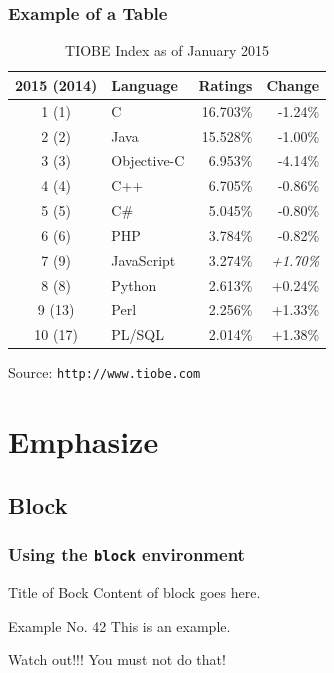 \documentclass[english,hangout]{FrankfurtUAS}
\begin{document}
\begin{frame}
 \frametitle{Example of a Table}
\begin{table}[ht]
 \begin{tabular}{clrr} \toprule
 2015 (2014)	& 	Language 	& Ratings 	& Change \\
 \midrule
1	(1)		& C		& 16.703\%	& -1.24\% \\
2	   (2)		& Java	& 15.528\%	& -1.00\% \\
3	   (3)		& Objective-C	& 6.953\%	& -4.14\% \\
4	   (4)		& C++	& 6.705\%	& -0.86\% \\
5	   (5)		& C\#		& 5.045\%	& -0.80\% \\
6	   (6)		& PHP	& 3.784\%	& -0.82\% \\
7	   (9)		& JavaScript	& 3.274\%	& \emph{+1.70\%} \\
8	   (8)		& Python	& 2.613\%	& +0.24\% \\
9	 (13)		& Perl	& 2.256\%	& +1.33\% \\
10	 (17)		& PL/SQL	& 2.014\%	& +1.38\% \\
\bottomrule
 \end{tabular}
 \caption{TIOBE Index as of January 2015}
\end{table}
\vspace{-3mm}
\tiny Source: \texttt{http://www.tiobe.com}
\end{frame}



\section{Emphasize}

\subsection{Block}

\begin{frame}
 \frametitle{Using the \texttt{block} environment}
\begin{block}{Title of Bock}
  Content of block goes here.
\end{block}

\begin{exampleblock}{Example No. 42}
  This is an example.
\end{exampleblock}
 
\begin{alertblock}{Watch out!!!}
  You must not do that!
\end{alertblock}
\end{frame}
\end{document}
